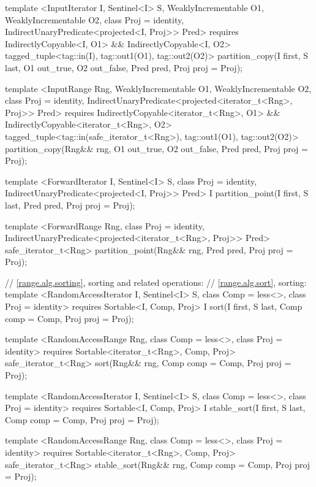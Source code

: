 {\begin{codeblock}
{{    template <InputIterator I, Sentinel<I> S, WeaklyIncrementable O1, WeaklyIncrementable O2,
        class Proj = identity, IndirectUnaryPredicate<projected<I, Proj>> Pred>
      requires IndirectlyCopyable<I, O1> && IndirectlyCopyable<I, O2>
      tagged_tuple<tag::in(I), tag::out1(O1), tag::out2(O2)>
        partition_copy(I first, S last, O1 out_true, O2 out_false, Pred pred,
                      Proj proj = Proj{});

    template <InputRange Rng, WeaklyIncrementable O1, WeaklyIncrementable O2,
        class Proj = identity,
        IndirectUnaryPredicate<projected<iterator_t<Rng>, Proj>> Pred>
      requires IndirectlyCopyable<iterator_t<Rng>, O1> &&
        IndirectlyCopyable<iterator_t<Rng>, O2>
      tagged_tuple<tag::in(safe_iterator_t<Rng>), tag::out1(O1), tag::out2(O2)>
        partition_copy(Rng&& rng, O1 out_true, O2 out_false, Pred pred, Proj proj = Proj{});

    template <ForwardIterator I, Sentinel<I> S, class Proj = identity,
        IndirectUnaryPredicate<projected<I, Proj>> Pred>
      I partition_point(I first, S last, Pred pred, Proj proj = Proj{});

    template <ForwardRange Rng, class Proj = identity,
        IndirectUnaryPredicate<projected<iterator_t<Rng>, Proj>> Pred>
      safe_iterator_t<Rng>
        partition_point(Rng&& rng, Pred pred, Proj proj = Proj{});

    // \ref{range.alg.sorting}, sorting and related operations:
    // \ref{range.alg.sort}, sorting:
    template <RandomAccessIterator I, Sentinel<I> S, class Comp = less<>,
        class Proj = identity>
      requires Sortable<I, Comp, Proj>
      I sort(I first, S last, Comp comp = Comp{}, Proj proj = Proj{});

    template <RandomAccessRange Rng, class Comp = less<>, class Proj = identity>
      requires Sortable<iterator_t<Rng>, Comp, Proj>
      safe_iterator_t<Rng>
        sort(Rng&& rng, Comp comp = Comp{}, Proj proj = Proj{});

    template <RandomAccessIterator I, Sentinel<I> S, class Comp = less<>,
        class Proj = identity>
      requires Sortable<I, Comp, Proj>
      I stable_sort(I first, S last, Comp comp = Comp{}, Proj proj = Proj{});

    template <RandomAccessRange Rng, class Comp = less<>, class Proj = identity>
      requires Sortable<iterator_t<Rng>, Comp, Proj>
      safe_iterator_t<Rng>
        stable_sort(Rng&& rng, Comp comp = Comp{}, Proj proj = Proj{});

}}
\end{codeblock}}

